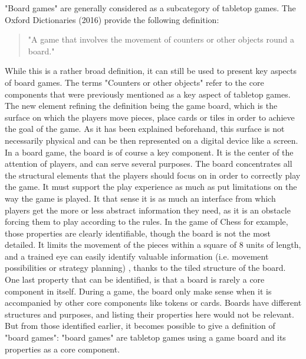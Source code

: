 "Board games" are generally considered as a subcategory of tabletop games. The Oxford Dictionaries (2016) provide the following definition:
\begin{quotation}
"A game that involves the movement of counters or other objects round a board."
\end{quotation}
While this is a rather broad definition, it can still be used to present key aspects of board games. The terms "Counters or other objects" refer to the core components that were previously mentioned as a key aspect of tabletop games. The new element refining the definition being the game board, which is the surface on which the players move pieces, place cards or tiles in order to achieve the goal of the game. As it has been explained beforehand, this surface is not necessarily physical and can be then represented on a digital device like a screen. In a board game, the board is of course a key component. It is the center of the attention of players, and can serve several purposes. 
The board concentrates all the structural elements that the players should focus on in order to correctly play the game. It must support the play experience as much as put limitations on the way the game is played. It that sense it is as much an interface from which players get the more or less abstract information they need, as it is an obstacle forcing them to play according to the rules. In the game of Chess for example, those properties are clearly identifiable, though the board is not the most detailed. It limits the movement of the pieces within a square of 8 units of length, and a trained eye can easily identify valuable information (i.e. movement possibilities or strategy planning) , thanks to the tiled structure of the board. One last property that can be identified, is that a board is rarely a core component in itself. During a game, the board only make sense when it is accompanied by other core components like tokens or cards. Boards have different structures and purposes, and listing their properties here would not be relevant. But from those identified earlier, it becomes possible to give a definition of "board games": "board games" are tabletop games using a game board and its properties as a core component.

